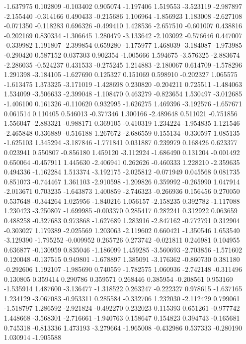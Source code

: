 -1.637975
0.102809
-0.103402
0.905074
-1.197406
1.519553
-3.523119
-2.987897
-2.155440
-0.314166
0.490433
-0.215686
1.106964
-1.856923
1.183008
-2.627108
-0.071350
-0.118283
0.696326
-0.499410
1.428536
-2.657510
-0.601007
0.438816
-0.202169
0.830334
-1.306645
1.280479
-3.133642
-2.103092
-0.576646
0.447007
-0.339982
1.191807
-2.399854
0.659280
-1.175977
1.468039
-3.184087
-1.973985
-0.290420
0.587152
0.037303
0.902354
-1.005666
1.594675
-3.576325
-2.883674
-2.286035
-0.524237
0.431533
-0.275245
1.214883
-2.180067
0.614709
-1.578296
1.291398
-3.184105
-1.627690
0.125327
0.151069
0.598910
-0.202327
1.065575
-1.613475
1.373325
-3.171019
-1.428698
0.230820
-0.204211
0.725511
-1.484063
1.534099
-3.506633
-2.399048
-1.108470
0.463279
-0.823654
1.530497
-3.012685
-1.406100
0.161326
-0.110620
0.932995
-1.626275
1.469396
-3.192576
-1.657671
0.061514
0.110405
0.546013
-0.377346
1.300166
-2.489648
0.511021
-0.751856
1.556047
-2.883321
-0.988171
0.369105
-0.410319
1.234224
-1.954835
1.121546
-2.465848
0.336889
-0.516188
1.267672
-2.686559
0.155134
-0.330597
1.085135
-1.625103
1.345294
-3.187846
-1.771841
0.031887
0.239979
0.168426
0.623377
0.023941
0.550807
-0.856180
1.459120
-3.112924
-1.686490
0.131204
-0.001492
0.650064
-0.457911
1.445630
-2.406941
0.262626
-0.460333
1.228210
-2.359635
0.494336
-1.162284
1.513374
-3.192175
-2.025812
-0.071949
0.045568
0.081735
0.851073
-0.744467
1.361103
-2.910598
-1.209826
0.359992
-0.265990
1.047914
-2.013671
0.703235
-1.643873
1.400859
-2.746323
-0.266936
0.156456
0.270050
0.537648
-0.344264
1.025956
-1.840216
1.056157
-2.158235
0.392782
-1.117088
1.230423
-3.250807
-1.699985
-0.003370
0.285417
0.282241
0.312922
0.063659
0.488258
-0.327683
0.973868
-1.627689
1.283916
-2.847162
-0.772791
0.312904
-0.303027
1.179389
-2.025569
1.203063
-2.119602
0.660421
-1.350546
1.653540
-3.129390
-1.795252
-0.009952
0.265726
0.273742
-0.021811
0.246981
0.104955
0.636877
-0.130959
0.835046
-1.186099
1.459285
-3.560693
-2.703856
-1.571602
0.120048
-0.137515
0.949801
-1.678897
1.385091
-3.176362
-0.860730
0.381180
-0.292606
1.192107
-1.985690
0.740559
-1.782575
1.060936
-2.742148
-0.311496
0.130805
0.359414
0.290786
0.359571
0.268446
0.385954
-0.208561
0.953160
-1.535914
1.487600
-3.136477
-1.318522
0.263247
-0.222327
0.978615
-1.637165
1.234129
-3.067083
-0.953311
0.285584
-0.332706
1.232030
-2.112429
0.799061
-1.518797
1.286592
-2.921824
-0.492270
0.232023
0.115393
0.651261
-0.977742
1.448668
-3.568301
-2.716661
-1.940763
0.158647
0.154823
0.394743
-0.165681
0.745318
-0.813336
1.473193
-3.279664
-1.965008
-0.432986
0.537333
-0.280190
1.030914
-1.905588

